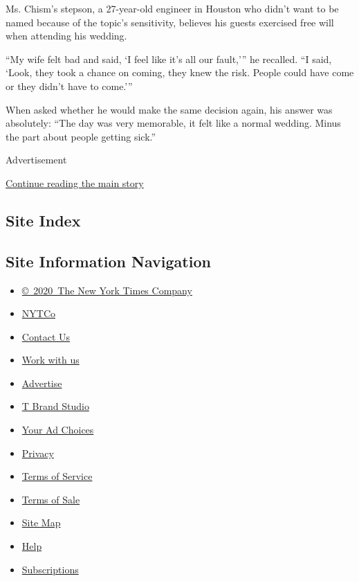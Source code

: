 Ms. Chism's stepson, a 27-year-old engineer in Houston who didn't want
to be named because of the topic's sensitivity, believes his guests
exercised free will when attending his wedding.

``My wife felt bad and said, `I feel like it's all our fault,''' he
recalled. ``I said, `Look, they took a chance on coming, they knew the
risk. People could have come or they didn't have to come.'''

When asked whether he would make the same decision again, his answer was
absolutely: ``The day was very memorable, it felt like a normal wedding.
Minus the part about people getting sick.''

Advertisement

\protect\hyperlink{after-bottom}{Continue reading the main story}

\hypertarget{site-index}{%
\subsection{Site Index}\label{site-index}}

\hypertarget{site-information-navigation}{%
\subsection{Site Information
Navigation}\label{site-information-navigation}}

\begin{itemize}
\tightlist
\item
  \href{https://help.nytimes.com/hc/en-us/articles/115014792127-Copyright-notice}{©~2020~The
  New York Times Company}
\end{itemize}

\begin{itemize}
\tightlist
\item
  \href{https://www.nytco.com/}{NYTCo}
\item
  \href{https://help.nytimes.com/hc/en-us/articles/115015385887-Contact-Us}{Contact
  Us}
\item
  \href{https://www.nytco.com/careers/}{Work with us}
\item
  \href{https://nytmediakit.com/}{Advertise}
\item
  \href{http://www.tbrandstudio.com/}{T Brand Studio}
\item
  \href{https://www.nytimes.com/privacy/cookie-policy\#how-do-i-manage-trackers}{Your
  Ad Choices}
\item
  \href{https://www.nytimes.com/privacy}{Privacy}
\item
  \href{https://help.nytimes.com/hc/en-us/articles/115014893428-Terms-of-service}{Terms
  of Service}
\item
  \href{https://help.nytimes.com/hc/en-us/articles/115014893968-Terms-of-sale}{Terms
  of Sale}
\item
  \href{https://spiderbites.nytimes.com}{Site Map}
\item
  \href{https://help.nytimes.com/hc/en-us}{Help}
\item
  \href{https://www.nytimes.com/subscription?campaignId=37WXW}{Subscriptions}
\end{itemize}
